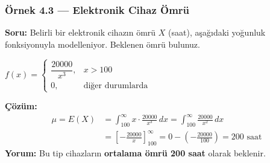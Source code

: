 \documentclass[light]{lutbeamer}
\begin{document}
\begin{frame}[fragile]
  \frametitle[Örnek 4.3]{Örnek 4.3 --- Elektronik Cihaz Ömrü}

  \smallskip
  \textbf{Soru:} Belirli bir elektronik cihazın ömrü $X$ (saat), aşağıdaki yoğunluk fonksiyonuyla modelleniyor. Beklenen ömrü bulunuz.
  \begin{center}
    $f(x) = \begin{cases} \dfrac{20000}{x^3}, & x > 100 \\[4pt] 0, & \text{diğer durumlarda} \end{cases}$
  \end{center}

  \textbf{Çözüm:}
  {\small
  \begin{align*}
    \mu = E(X) &= \int_{100}^{\infty} x \cdot \frac{20000}{x^3} \,dx = \int_{100}^{\infty} \frac{20000}{x^2} \,dx \\[4pt]
               &= \left[ -\frac{20000}{x} \right]_{100}^{\infty} = 0 - \!\left(-\frac{20000}{100}\right) = 200 \text{ saat}
  \end{align*}
  }
  \textbf{Yorum:} Bu tip cihazların \textbf{ortalama ömrü 200 saat} olarak beklenir.
\end{frame}
\end{document}
